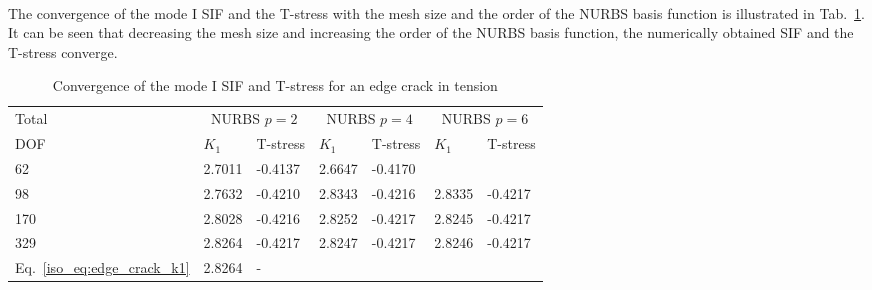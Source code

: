 \paragraph{}
The convergence of the mode \RN{1} SIF and the T-stress with the mesh size and the order of the NURBS basis function is illustrated in Tab.~\ref{iso_tab:edge_crack_res}.
It can be seen that decreasing the mesh size and increasing the order of the NURBS basis function, the numerically obtained SIF and the T-stress converge.
\begin{table}
    \caption{Convergence of the mode \RN{1} SIF and T-stress for an edge crack in tension}
    \label{iso_tab:edge_crack_res}
    \begin{tabularx}{\textwidth}{XXXXXXX}
        \toprule
            Total    &   \multicolumn{2}{c}{NURBS $p=2$} &\multicolumn{2}{c}{NURBS $p=4$} &\multicolumn{2}{c}{NURBS $p=6$}\\
            \cmidrule{2-7}
            DOF      &   $K_1$   &   T-stress            &$K_1$   &   T-stress            &$K_1$   &   T-stress           \\
            \cmidrule{1-1} \cmidrule{2-3} \cmidrule{4-5} \cmidrule{6-7}
            62       &   2.7011  &   -0.4137             &2.6647  &-0.4170                &        &                      \\
            98       &   2.7632  &   -0.4210             &2.8343  &-0.4216                &2.8335  &-0.4217               \\
            170      &   2.8028  &   -0.4216             &2.8252  &-0.4217                &2.8245  &-0.4217               \\
            329      &   2.8264  &   -0.4217             &2.8247  &-0.4217                &2.8246  &-0.4217               \\
            Eq.~\ref{iso_eq:edge_crack_k1} & 2.8264 & - & & & & \\
        \bottomrule
        \end{tabularx}
\end{table}

